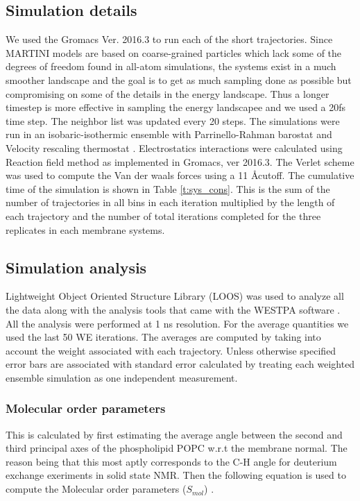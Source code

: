  \subsection{Simulation details}
 \label{ss:ssim_details}
We used the Gromacs Ver. 2016.3 to run each of the short 
trajectories\cite{Lindahl2015}. Since MARTINI models are based on 
coarse-grained particles which lack some of the degrees of freedom found
in all-atom simulations, the systems exist in a much smoother landscape and 
the goal is to get as much sampling done as possible but compromising on 
some of the details in the energy landscape\cite{Marrink2013}. Thus a longer timestep
is more effective in sampling the energy landscapee and we used a 20fs 
time step.\cite{Wilfred2009} The neighbor list was updated 
every 20 steps. The simulations were run in an isobaric-isothermic 
ensemble with Parrinello-Rahman barostat \cite{Rahman1981,RahmanParrinello2007} and Velocity 
rescaling thermostat \cite{Parrinello2007}. Electrostatics interactions 
were calculated using Reaction field method as implemented in Gromacs, 
ver 2016.3.\cite{Watts1973} The Verlet scheme was used to compute the Van
der waals forces using a 11 \AA cutoff. The cumulative time of the 
simulation is shown in Table \ref{t:sys_cons}. This is the sum of the number of 
trajectories in all bins in each iteration multiplied by the length of 
each trajectory and the number of total iterations completed for the three 
replicates in each membrane systems.

\subsection{Simulation analysis}
\label{ss:sim_analysis}
Lightweight Object Oriented Structure Library (LOOS) was used to analyze all the data along with the analysis tools that came with the WESTPA software \cite{WESTPA2015,Grossfield2014, Grossfield2009, LOOS_github}. All the analysis were performed at 1 ns resolution. For the average quantities we used the last 50 WE iterations. The averages are computed by taking into account the weight associated with each trajectory. Unless otherwise specified error bars are associated with standard error calculated by treating each weighted ensemble simulation as one independent measurement.

\subsubsection{Molecular order parameters}
\label{sss:mol_ord}
This is calculated by first estimating the average angle between the
second and third principal axes of the phospholipid POPC w.r.t the 
membrane normal. The reason being that this most aptly corresponds to 
the C-H angle for deuterium exchange exeriments in solid state NMR. 
Then the following equation is used to compute the Molecular order 
parameters ($S_{mol}$) \cite{Seelig1977}.


